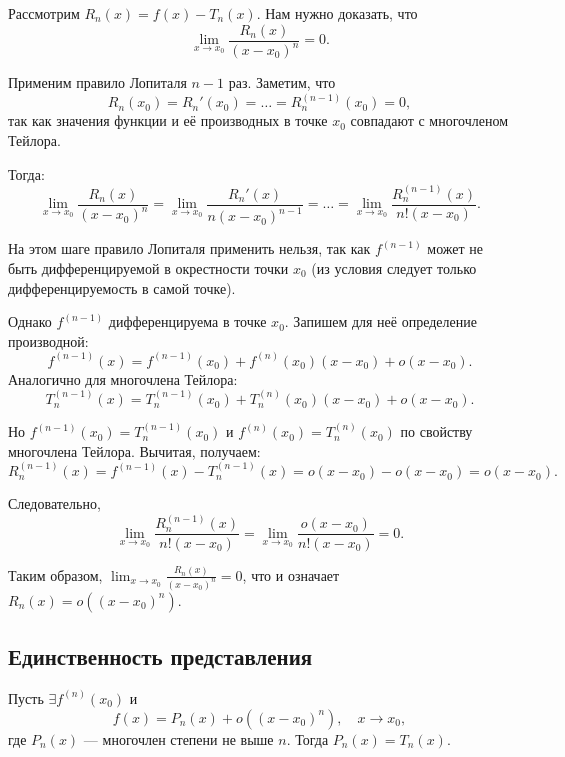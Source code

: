 \begin{Proof}
    Рассмотрим \(R_n(x) = f(x) - T_n(x)\). Нам нужно доказать, что
    \[
    \lim_{x \to x_0} \frac{R_n(x)}{(x - x_0)^n} = 0.
    \]
    
    Применим правило Лопиталя \(n-1\) раз. Заметим, что
    \[
    R_n(x_0) = R_n'(x_0) = \dots = R_n^{(n-1)}(x_0) = 0,
    \]
    так как значения функции и её производных в точке \(x_0\) совпадают с многочленом Тейлора.
    
    Тогда:
    \[
    \lim_{x \to x_0} \frac{R_n(x)}{(x - x_0)^n} = 
    \lim_{x \to x_0} \frac{R_n'(x)}{n(x - x_0)^{n-1}} = 
    \dots = 
    \lim_{x \to x_0} \frac{R_n^{(n-1)}(x)}{n!(x - x_0)}.
    \]
    
    На этом шаге правило Лопиталя применить нельзя, так как \(f^{(n-1)}\) может не быть дифференцируемой в окрестности точки \(x_0\) (из условия следует только дифференцируемость в самой точке).
    
    Однако \(f^{(n-1)}\) дифференцируема в точке \(x_0\). Запишем для неё определение производной:
    \[
    f^{(n-1)}(x) = f^{(n-1)}(x_0) + f^{(n)}(x_0)(x - x_0) + o(x - x_0).
    \]
    Аналогично для многочлена Тейлора:
    \[
    T_n^{(n-1)}(x) = T_n^{(n-1)}(x_0) + T_n^{(n)}(x_0)(x - x_0) + o(x - x_0).
    \]
    
    Но \(f^{(n-1)}(x_0) = T_n^{(n-1)}(x_0)\) и \(f^{(n)}(x_0) = T_n^{(n)}(x_0)\) по свойству многочлена Тейлора. Вычитая, получаем:
    \[
    R_n^{(n-1)}(x) = f^{(n-1)}(x) - T_n^{(n-1)}(x) = o(x - x_0) - o(x - x_0) = o(x - x_0).
    \]
    
    Следовательно,
    \[
    \lim_{x \to x_0} \frac{R_n^{(n-1)}(x)}{n!(x - x_0)} = \lim_{x \to x_0} \frac{o(x - x_0)}{n!(x - x_0)} = 0.
    \]
    
    Таким образом, \(\displaystyle \lim_{x \to x_0} \frac{R_n(x)}{(x - x_0)^n} = 0\), что и означает \(R_n(x) = o((x - x_0)^n)\).
\end{Proof}

\subsection{Единственность представления}

\begin{theorem}[О единственности]
    Пусть \(\exists f^{(n)}(x_0)\) и 
    \[
    f(x) = P_n(x) + o((x - x_0)^n), \quad x \to x_0,
    \]
    где \(P_n(x)\) — многочлен степени не выше \(n\). Тогда \(P_n(x) = T_n(x)\).
\end{theorem}

